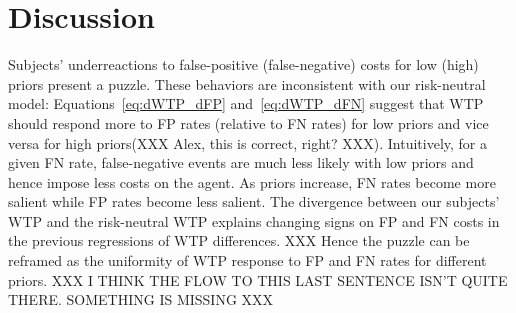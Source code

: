 \documentclass[12pt,a4paper]{article}
\newcommand{\agt}[1]{{\color{OliveGreen}#1}}
\begin{document}
\section{Discussion}


Subjects' underreactions to false-positive (false-negative) costs for low (high) priors present a puzzle. These behaviors are inconsistent with our risk-neutral model: Equations~\ref{eq:dWTP_dFP} and~\ref{eq:dWTP_dFN} suggest that WTP should respond more to FP rates (relative to FN rates) for low priors and vice versa for high priors\agt{(XXX Alex, this is correct, right? XXX)}. Intuitively, for a given FN rate, false-negative events are much less likely with low priors and hence impose less costs on the agent. As priors increase, FN rates become more salient while FP rates become less salient. 
The divergence between our subjects' WTP and the risk-neutral WTP explains changing signs on FP and FN costs in the previous regressions of WTP differences. \agt{XXX Hence the puzzle can be reframed as the uniformity of WTP response to FP and FN rates for different priors. XXX I THINK THE FLOW TO THIS LAST SENTENCE ISN'T QUITE THERE. SOMETHING IS MISSING XXX}




\end{document}
